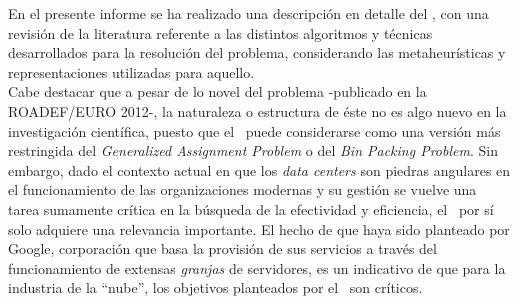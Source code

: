 \documentclass[../informe2.tex]{subfiles}
\begin{document}

En el presente informe se ha realizado una descripción en detalle del \mrp, con una revisión de la literatura referente a las distintos algoritmos y técnicas desarrollados para la resolución del problema, considerando las metaheurísticas y representaciones utilizadas para aquello. \\
Cabe destacar que a pesar de lo novel del problema -publicado en la ROADEF/EURO 2012-, la naturaleza o estructura de éste no es algo nuevo en la investigación científica, puesto que el \mrp\ puede considerarse como una versión más restringida del \textit{Generalized Assignment Problem} o del \textit{Bin Packing Problem}. Sin embargo, dado el contexto actual en que los \textit{data centers} son piedras angulares en el funcionamiento de las organizaciones modernas y su gestión se vuelve una tarea sumamente crítica en la búsqueda de la efectividad y eficiencia, el \mrp\ por sí solo adquiere una relevancia importante. El hecho de que haya sido planteado por Google, corporación que basa la provisión de sus servicios a través del funcionamiento de extensas \textit{granjas} de servidores, es un indicativo de que para la industria de la ``nube'', los objetivos planteados por el  \mrp\ son críticos. \\
\end{document}
